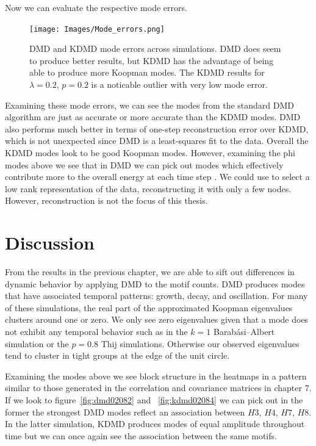 Now we can evaluate the respective mode errors.

\begin{figure}
    \texttt{[image: Images/Mode\_errors.png]}
    \centering
    \caption{DMD and KDMD mode errors across simulations. DMD does seem to produce 
    better results, but KDMD has the advantage of being able to produce more Koopman modes. The
    KDMD results for $\lambda=0.2$, $p=0.2$ is a noticable outlier with very low mode error.}
\end{figure}

\FloatBarrier

Examining these mode errors, we can see the modes
from the standard DMD algorithm are just as accurate or more 
 accurate than the KDMD modes. DMD also performs much better in terms of one-step
reconstruction error over KDMD, which is not unexpected since 
DMD is a least-squares fit to the data. Overall the KDMD modes look to 
be good Koopman modes. However, examining the phi modes above we see that in 
DMD we can pick out modes which effectively contribute more to the overall energy 
at each time step \cite{chris}. We could use to select a low rank representation
of the data, reconstructing it with only a few nodes. However, reconstruction is not the focus 
of this thesis.


\chapter{Discussion}
From the results in the previous chapter, we are able to sift out differences in dynamic behavior by applying
 DMD to the motif counts. DMD produces modes that have associated temporal
patterns: growth, decay, and oscillation. For many of these simulations, the real part of
 the approximated Koopman eigenvalues clusters around one or zero. We only see zero eigenvalues
given that a mode does not exhibit any temporal behavior such as in the $k=1$ Barabási–Albert 
simulation or the $p=0.8$ Thij simulations. Otherwise our observed eigenvalues tend to cluster
in tight groups at the edge of the unit circle. 

Examining the modes above we see block structure in the heatmaps in a pattern similar to those 
generated in the correlation and covariance matrices in chapter 7. If we look to 
figure~\ref{fig:dmd02082} and ~\ref{fig:kdmd02084} we can pick out in the former the strongest
DMD modes reflect an association between $H3$, $H4$, $H7$, $H8$. In the latter simulation, KDMD produces
modes of equal amplitude throughout time but we can once again see the association between the same motifs. 

